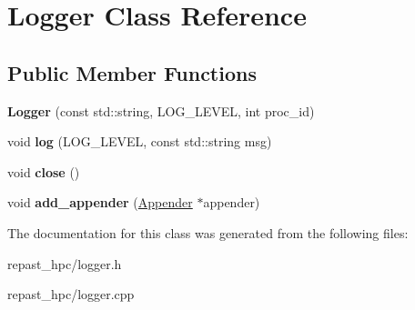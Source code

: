 \hypertarget{class_logger}{\section{Logger Class Reference}
\label{class_logger}
}
\subsection*{Public Member Functions}
\begin{DoxyCompactItemize}
\item 
\hypertarget{class_logger_ad4bef2613eb1eba924d90561c646203a}{{\bfseries Logger} (const std\-::string, L\-O\-G\-\_\-\-L\-E\-V\-E\-L, int proc\-\_\-id)}\label{class_logger_ad4bef2613eb1eba924d90561c646203a}

\item 
\hypertarget{class_logger_ac05e48b3ad9831593c664a7e1a198e47}{void {\bfseries log} (L\-O\-G\-\_\-\-L\-E\-V\-E\-L, const std\-::string msg)}\label{class_logger_ac05e48b3ad9831593c664a7e1a198e47}

\item 
\hypertarget{class_logger_afee2bab560c2db0190c980884d33868c}{void {\bfseries close} ()}\label{class_logger_afee2bab560c2db0190c980884d33868c}

\item 
\hypertarget{class_logger_a7075e9cf5373d978dd346040f09043a8}{void {\bfseries add\-\_\-appender} (\hyperlink{class_appender}{Appender} $\ast$appender)}\label{class_logger_a7075e9cf5373d978dd346040f09043a8}

\end{DoxyCompactItemize}


The documentation for this class was generated from the following files\-:\begin{DoxyCompactItemize}
\item 
repast\-\_\-hpc/logger.\-h\item 
repast\-\_\-hpc/logger.\-cpp\end{DoxyCompactItemize}
